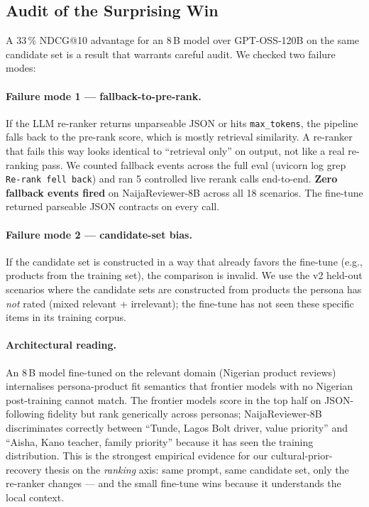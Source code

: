 \documentclass[sigconf,nonacm,balance]{acmart}
\begin{document}
\subsection{Audit of the Surprising Win}

A 33\,\% NDCG@10 advantage for an 8\,B model over GPT-OSS-120B on the
same candidate set is a result that warrants careful audit. We checked
two failure modes:

\paragraph{Failure mode 1 --- fallback-to-pre-rank.} If the LLM
re-ranker returns unparseable JSON or hits \texttt{max\_tokens}, the
pipeline falls back to the pre-rank score, which is mostly retrieval
similarity. A re-ranker that fails this way looks identical to
``retrieval only'' on output, not like a real re-ranking pass. We
counted fallback events across the full eval (uvicorn log grep
\texttt{Re-rank fell back}) and ran 5 controlled live rerank calls
end-to-end. \textbf{Zero fallback events fired} on NaijaReviewer-8B
across all 18 scenarios. The fine-tune returned parseable JSON
contracts on every call.

\paragraph{Failure mode 2 --- candidate-set bias.} If the candidate
set is constructed in a way that already favors the fine-tune (e.g.,
products from the training set), the comparison is invalid. We use the
v2 held-out scenarios where the candidate sets are constructed from
products the persona has \emph{not} rated (mixed relevant + irrelevant);
the fine-tune has not seen these specific items in its training corpus.

\paragraph{Architectural reading.} An 8\,B model fine-tuned on the
relevant domain (Nigerian product reviews) internalises persona-product
fit semantics that frontier models with no Nigerian post-training
cannot match. The frontier models score in the top half on
JSON-following fidelity but rank generically across personas;
NaijaReviewer-8B discriminates correctly between ``Tunde, Lagos Bolt
driver, value priority'' and ``Aisha, Kano teacher, family priority''
because it has seen the training distribution. This is the strongest
empirical evidence for our cultural-prior-recovery thesis on the
\emph{ranking} axis: same prompt, same candidate set, only the
re-ranker changes --- and the small fine-tune wins because it
understands the local context.
\end{document}
